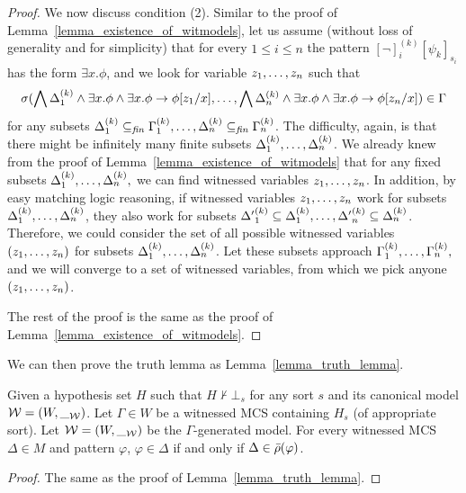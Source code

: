 \documentclass{amsart}
\begin{document}
\begin{proof}
We now discuss condition (2). 
Similar to the proof of
Lemma~\ref{lemma_existence_of_witmodels},
let us assume (without loss of generality and for simplicity) 
that for every $1 \le i \le n$
the pattern $[\neg]_i^{(k)}[\psi_k]_{s_i}$
has the form $\exists x . \phi$,
and we look for variable $z_1 ,\dots, z_n$ such that
$$
\sigma(\bigwedge \Delta_1^{(k)} \wedge \exists x . \phi 
                                \wedge \exists x . \phi \to \phi[z_1/x]
  ,\dots, \bigwedge \Delta_n^{(k)} \wedge \exists x . \phi
                                \wedge \exists x . \phi \to \phi[z_n/x])
\in \Gamma
$$
for any subsets 
$\Delta_1^{(k)} \subseteq_{\mathit{fin}} \Gamma_1^{(k)}
 ,\dots, 
 \Delta_n^{(k)} \subseteq_{\mathit{fin}} \Gamma_n^{(k)}
$.
The difficulty, again, is that there might be infinitely many
finite subsets $\Delta_1^{(k)} ,\dots, \Delta_n^{(k)}$.
We already knew from the proof of 
Lemma~\ref{lemma_existence_of_witmodels}
that for any fixed subsets
$\Delta_1^{(k)} 
 ,\dots, 
 \Delta_n^{(k)},
$
we can find witnessed variables $z_1 ,\dots, z_n$.
In addition, by easy matching logic reasoning,
if witnessed variables $z_1 ,\dots, z_n$
work for subsets  
$\Delta_1^{(k)} 
 ,\dots, 
 \Delta_n^{(k)}
$,
they also work for subsets
${\Delta'}_1^{(k)} \subseteq \Delta_1^{(k)} 
 ,\dots, 
 {\Delta'}_n^{(k)} \subseteq \Delta_n^{(k)}
$.
Therefore,
we could consider the set of all possible
witnessed variables
$(z_1 ,\dots, z_n)$ for subsets 
$\Delta_1^{(k)} 
 ,\dots, 
 \Delta_n^{(k)}
$.
Let these subsets approach
$\Gamma_1^{(k)} 
 ,\dots, 
 \Gamma_n^{(k)},
$
and we will converge to a set of witnessed variables,
from which we pick anyone $(z_1 ,\dots, z_n)$.

The rest of the proof is the same as the proof of 
Lemma~\ref{lemma_existence_of_witmodels}.
\end{proof}

We can then prove the truth lemma as Lemma~\ref{lemma_truth_lemma}.
\begin{lemma}
\label{lemma_truth_lemma_two}
Given a hypothesis set $H$ 
such that $H \not\vdash \bot_s$ for any sort $s$
and its canonical model $\mathcal{W} = (W,\__{\mathcal{W}})$.
Let $\Gamma \in W$ be a witnessed MCS containing $H_s$
(of appropriate sort).
Let $\mathcal{W} = (W, \__{\mathcal{W}})$ be the $\Gamma$-generated model.
For every witnessed MCS $\Delta \in M$ and pattern $\varphi$,
$\varphi \in \Delta$ if and only if $\Delta \in \bar{\rho}(\varphi)$.
\end{lemma}
\begin{proof}
The same as the proof of Lemma~\ref{lemma_truth_lemma}.
\end{proof}
\end{document}
